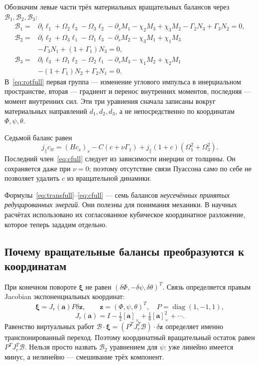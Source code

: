 \documentclass[11pt,a4paper]{article}
\begin{document}
Обозначим левые части трёх материальных вращательных балансов через $\mathcal B_1,\mathcal B_2,\mathcal B_3$:
\begin{equation}
\begin{aligned}
\mathcal B_1={}&\partial_t\ell_1+\Omega_2\ell_3-\Omega_3\ell_2
-\partial_sM_1-\chi_2M_3+\chi_3M_2
-\Gamma_2N_3+\Gamma_3N_2=0,\\
\mathcal B_2={}&\partial_t\ell_2+\Omega_3\ell_1-\Omega_1\ell_3
-\partial_sM_2-\chi_3M_1+\chi_1M_3\\
&-\Gamma_3N_1+(1+\Gamma_1)N_3=0,\\
\mathcal B_3={}&\partial_t\ell_3+\Omega_1\ell_2-\Omega_2\ell_1
-\partial_sM_3-\chi_1M_2+\chi_2M_1\\
&-(1+\Gamma_1)N_2+\Gamma_2N_1=0.
\end{aligned}
\label{eq:rotfull}
\end{equation}
В~\eqref{eq:rotfull} первая группа --- изменение углового импульса в инерциальном пространстве, вторая --- градиент и перенос внутренних моментов, последняя --- момент внутренних сил. Эти три уравнения сначала записаны вокруг материальных направлений $d_1,d_2,d_3$, а не непосредственно по координатам $\Phi,\psi,\theta$.

Седьмой баланс равен
\begin{equation}
j_\parallel c_{tt}=(Hc_s)_s-C(c+\nu\Gamma_1)
+j_\parallel(1+c)(\Omega_1^2+\Omega_3^2).
\label{eq:cfull}
\end{equation}
Последний член~\eqref{eq:cfull} следует из зависимости инерции от толщины. Он сохраняется даже при $\nu=0$; поэтому отсутствие связи Пуассона само по себе не позволяет удалить $c$ из вращательной динамики.

Формулы~\eqref{eq:transfull}--\eqref{eq:cfull} --- семь балансов \emph{неусечённых принятых редуцированных энергий}. Они полезны для понимания механики. В научных расчётах использовано их согласованное кубическое координатное разложение, которое теперь зададим отдельно.

\subsection{Почему вращательные балансы преобразуются к координатам}
При конечном повороте $\boldsymbol\xi$ не равен $(\delta\Phi,-\delta\psi,\delta\theta)^T$. Связь определяется правым Jacobian экспоненциальных координат:
\[
\boldsymbol\xi=J_r(\mathbf a)P\delta\mathbf z,\qquad
\mathbf z=(\Phi,\psi,\theta)^T,\quad P=\operatorname{diag}(1,-1,1),
\]
\[
J_r(\mathbf a)=I-\tfrac12[\mathbf a]_\times+\tfrac16[\mathbf a]_\times^2+\cdots.
\]
Равенство виртуальных работ
$\boldsymbol{\mathcal B}\cdot\boldsymbol\xi
=(P^TJ_r^T\boldsymbol{\mathcal B})\cdot\delta\mathbf z$
определяет именно транспонированный переход. Поэтому координатный вращательный остаток равен $P^TJ_r^T\boldsymbol{\mathcal B}$. Нельзя просто назвать $\mathcal B_2$ уравнением для $\psi$: уже линейно имеется минус, а нелинейно --- смешивание трёх компонент.
\end{document}
